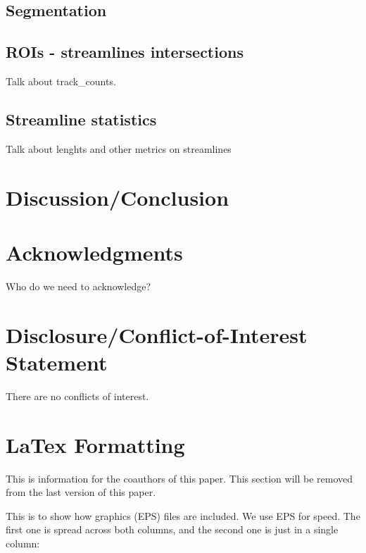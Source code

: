 \documentclass{bioinfo}
\begin{document}
\subsection{Segmentation}

\subsection{ROIs - streamlines intersections}

Talk about track\_counts.

\subsection{Streamline statistics}

Talk about lenghts and other metrics on streamlines

\section{Discussion/Conclusion}

\section*{Acknowledgments}
Who do we need to acknowledge?

\section*{Disclosure/Conflict-of-Interest Statement}
There are no conflicts of interest.

\section{LaTex Formatting}

This is information for the coauthors of this paper. This section will be removed from the last version of this paper.

This is to show how graphics (EPS) files are included. We use EPS for
speed. The first one is spread across both columns, and the second one
is just in a single column:
\end{document}
